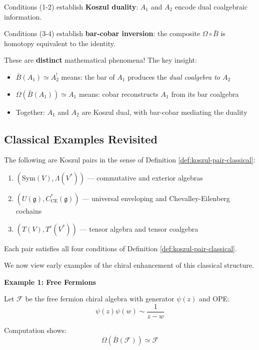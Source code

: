 \begin{remark}
\label{rem:two-phenomena}
Conditions (1-2) establish \textbf{Koszul duality}: $A_1$ and $A_2$ encode dual coalgebraic information.

Conditions (3-4) establish \textbf{bar-cobar inversion}: the composite $\Omega \circ \bar{B}$ is homotopy equivalent to the identity.

These are \textbf{distinct} mathematical phenomena! The key insight:
\begin{itemize}
\item $\bar{B}(A_1) \simeq A_2^!$ means: the bar of $A_1$ produces the \emph{dual coalgebra to $A_2$}
\item $\Omega(\bar{B}(A_1)) \simeq A_1$ means: cobar reconstructs $A_1$ from its bar coalgebra
\item Together: $A_1$ and $A_2$ are Koszul dual, with bar-cobar mediating the duality
\end{itemize}
\end{remark}

\subsection{Classical Examples Revisited}

\begin{theorem}
The following are Koszul pairs in the sense of Definition \ref{def:koszul-pair-classical}:
\begin{enumerate}
\item $(\text{Sym}(V), \Lambda(V^*))$ — commutative and exterior algebras
\item $(U(\mathfrak{g}), C^*_{\text{CE}}(\mathfrak{g}))$ — universal enveloping and Chevalley-Eilenberg cochains
\item $(T(V), T^c(V^*))$ — tensor algebra and tensor coalgebra
\end{enumerate}
Each pair satisfies all four conditions of Definition \ref{def:koszul-pair-classical}.
\end{theorem}

We now view early examples of the chiral enhancement of this classical structure.


\textbf{Example 1: Free Fermions}

Let $\mathcal{F}$ be the free fermion chiral algebra with generator $\psi(z)$ and OPE:
$$\psi(z)\psi(w) \sim \frac{1}{z-w}$$

Computation shows:
$$\Omega(\bar{B}(\mathcal{F})) \simeq \mathcal{F}$$


